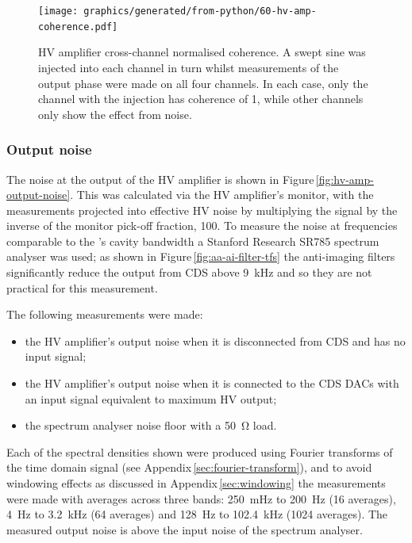 \begin{figure}
  \centering
  \texttt{[image: graphics/generated/from-python/60-hv-amp-coherence.pdf]}
  \caption[High voltage amplifier cross-channel coherence]{\gls{HV} amplifier cross-channel normalised coherence. A swept sine was injected into each channel in turn whilst measurements of the output phase were made on all four channels. In each case, only the channel with the injection has coherence of \num{1}, while other channels only show the effect from noise.}
  \label{fig:hv-amp-coherence}
\end{figure}

\subsubsection{Output noise}
The noise at the output of the \gls{HV} amplifier is shown in Figure\,\ref{fig:hv-amp-output-noise}. This was calculated via the \gls{HV} amplifier's monitor, with the measurements projected into effective \gls{HV} noise by multiplying the signal by the inverse of the monitor pick-off fraction, \num{100}. To measure the noise at frequencies comparable to the \SSMEXPT{}'s cavity bandwidth a Stanford Research SR785 spectrum analyser was used; as shown in Figure\,\ref{fig:aa-ai-filter-tfs} the anti-imaging filters significantly reduce the output from \gls{CDS} above \SI{9}{\kilo\hertz} and so they are not practical for this measurement.

The following measurements were made:
\begin{itemize}
  \item the \gls{HV} amplifier's output noise when it is disconnected from \gls{CDS} and has no input signal;
  \item the \gls{HV} amplifier's output noise when it is connected to the \gls{CDS} \glspl{DAC} with an input signal equivalent to maximum \gls{HV} output;
  \item the spectrum analyser noise floor with a \SI{50}{\ohm} load.
\end{itemize}
Each of the spectral densities shown were produced using Fourier transforms of the time domain signal (see Appendix\,\ref{sec:fourier-transform}), and to avoid windowing effects as discussed in Appendix\,\ref{sec:windowing} the measurements were made with averages across three bands: \SI{250}{\milli\hertz} to \SI{200}{\hertz} (\num{16} averages), \SI{4}{\hertz} to \SI{3.2}{\kilo\hertz} (\num{64} averages) and \SI{128}{\hertz} to \SI{102.4}{\kilo\hertz} (\num{1024} averages). The measured output noise is above the input noise of the spectrum analyser.

